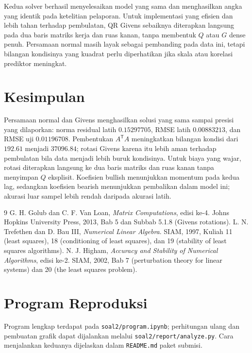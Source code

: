 \documentclass[11pt,a4paper]{article}
\numberwithin{equation}{section}
\begin{document}
Kedua solver berhasil menyelesaikan model yang sama dan menghasilkan angka yang identik pada ketelitian pelaporan. Untuk implementasi yang efisien dan lebih tahan terhadap pembulatan, QR Givens sebaiknya diterapkan langsung pada dua baris matriks kerja dan ruas kanan, tanpa membentuk $Q$ atau $G$ dense penuh. Persamaan normal masih layak sebagai pembanding pada data ini, tetapi bilangan kondisinya yang kuadrat perlu diperhatikan jika skala atau korelasi prediktor meningkat.


\section{Kesimpulan}
Persamaan normal dan Givens menghasilkan solusi yang sama sampai presisi yang dilaporkan: norma residual latih $0.15297705$, RMSE latih $0.00883213$, dan RMSE uji $0.01196708$. Pembentukan $A^\mathsf{T}A$ meningkatkan bilangan kondisi dari $192.61$ menjadi $37096.84$; rotasi Givens karena itu lebih aman terhadap pembulatan bila data menjadi lebih buruk kondisinya. Untuk biaya yang wajar, rotasi diterapkan langsung ke dua baris matriks dan ruas kanan tanpa menyimpan $Q$ eksplisit. Koefisien bullish menunjukkan momentum pada kedua lag, sedangkan koefisien bearish menunjukkan pembalikan dalam model ini; akurasi luar sampel lebih rendah daripada akurasi latih.

\renewcommand{\refname}{Referensi}
\begin{thebibliography}{9}
 G. H. Golub dan C. F. Van Loan, \emph{Matrix Computations}, edisi ke-4. Johns Hopkins University Press, 2013, Bab 5 dan Subbab 5.1.8 (Givens rotations).
 L. N. Trefethen dan D. Bau III, \emph{Numerical Linear Algebra}. SIAM, 1997, Kuliah 11 (least squares), 18 (conditioning of least squares), dan 19 (stability of least squares algorithms).
 N. J. Higham, \emph{Accuracy and Stability of Numerical Algorithms}, edisi ke-2. SIAM, 2002, Bab 7 (perturbation theory for linear systems) dan 20 (the least squares problem).
\end{thebibliography}

\appendix
\section{Program Reproduksi}
Program lengkap terdapat pada \texttt{soal2/program.ipynb}; perhitungan ulang dan pembuatan grafik dapat dijalankan melalui \texttt{soal2/report/analyze.py}. Cara menjalankan keduanya dijelaskan dalam \texttt{README.md} paket submisi.\par
\end{document}

